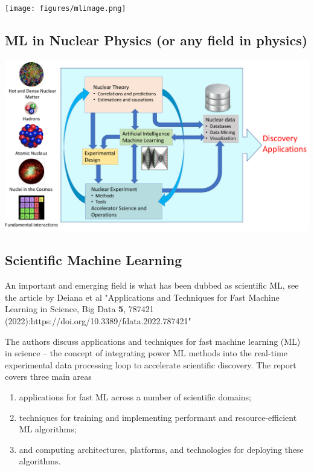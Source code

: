 \documentclass[%
oneside,                 %
final,                   %
10pt]{article}
\begin{document}
\centerline{\texttt{[image: figures/mlimage.png]}}

\vspace{6mm}

\subsection{ML in Nuclear  Physics (or any field in physics)}

\vspace{6mm}

\centerline{\includegraphics[width=1.0\linewidth]{figures/ML-NP.pdf}}

\vspace{6mm}

\subsection{Scientific Machine Learning}

An important and emerging field is what has been dubbed as scientific ML, see the article by Deiana et al "Applications and Techniques for Fast Machine Learning in Science, Big Data \textbf{5}, 787421 (2022):https://doi.org/10.3389/fdata.2022.787421"

\begin{block}{}
The authors discuss applications and techniques for fast machine
learning (ML) in science -- the concept of integrating power ML
methods into the real-time experimental data processing loop to
accelerate scientific discovery. The report covers three main areas

\begin{enumerate}
\item applications for fast ML across a number of scientific domains;

\item techniques for training and implementing performant and resource-efficient ML algorithms;

\item and computing architectures, platforms, and technologies for deploying these algorithms.
\end{enumerate}

\noindent
\end{block}
\end{document}
